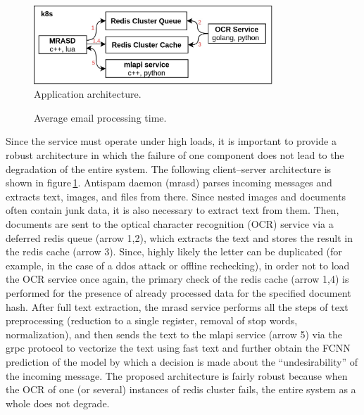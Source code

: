 \documentclass[12pt]{jpconf}
\begin{document}
\begin{figure}[h!]
	\center
	\includegraphics[width=0.8\textwidth]{images/architecture.jpg}
	\caption{\label{fig:01} Application architecture.}
\end{figure}

\begin{figure}[b]
\centering


\caption{\label{fig:02} Average email processing time.}

\end{figure}

Since the service must operate under high loads, it is important to provide a robust architecture in which the failure of one component does not lead to the degradation of the entire system. The following client--server architecture is shown in figure\,\ref{fig:01}. Antispam daemon (mrasd) parses incoming messages and extracts text, images, and files from there. Since nested images and documents often contain junk data, it is also necessary to extract text from them. Then, documents are sent to the optical character recognition (OCR) service via a deferred redis queue (arrow 1,2), which extracts the text and stores the result in the redis cache (arrow 3).
Since, highly likely the letter can be duplicated (for example, in the case of a ddos attack or offline rechecking), in order not to load the OCR service once again, the primary check of the redis cache (arrow 1,4) is performed for the presence of already processed data for the specified document hash.
After full text extraction, the mrasd service performs all the steps of text preprocessing (reduction to a single register, removal of stop words, normalization), and then sends the text to the mlapi service (arrow 5) via the grpc protocol to vectorize the text using fast text and further obtain the FCNN prediction of the model by which a decision is made about the ``undesirability'' of the incoming message.
The proposed architecture is fairly robust because when the OCR of one (or several) instances of redis cluster fails, the entire system as a whole does not degrade.
\end{document}
